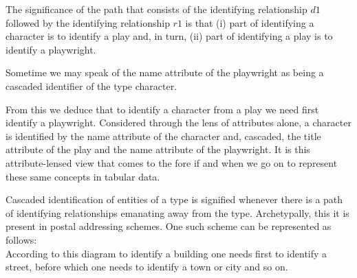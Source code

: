 The significance of the path that consists of the identifying relationship $d1$ followed by 
the identifying relationship $r1$ is that  
(i)  part of identifying a character is to identify a play and, in turn,
(ii) part of identifying a play is to identify a playwright. \begin{oldtt}
Sometime we may speak of the name attribute of the playwright as being a cascaded identifier of the type character.
\end{oldtt} From this we deduce that to identify a character from a play we need first identify a playwright. Considered through the lens of attributes alone, a character is identified by the name attribute of the character and, 
cascaded, the title attribute of the play and the name attribute of the playwright.
It is this attribute-lensed view that comes to the fore if and when we go on to represent these same concepts in tabular data.  

Cascaded identification of entities of a type is signified whenever there is a path of identifying relationships emanating away from the type. 
Archetypally, this it is present in postal addressing schemes. One such scheme can be represented as follows:
\begin{equation*}

\end{equation*}
According to this diagram to identify a building one needs first to identify a street, before which one needs to identify a town or city and so on.


